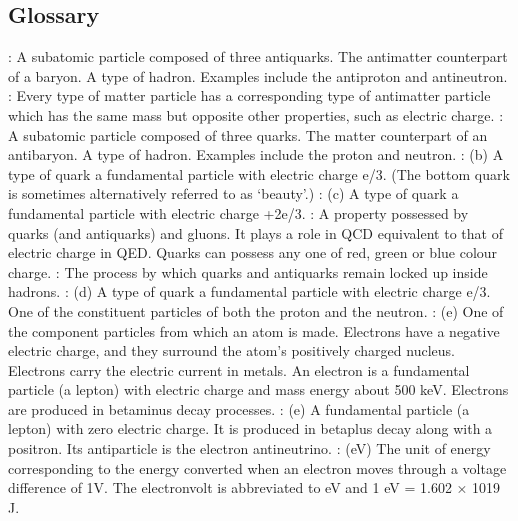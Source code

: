 \documentclass[letterpaper,10pt,english]{sphinxmanual}
\begin{document}
\subsection{Glossary}
\label{\detokenize{content/session_01/Part_01_glossary:Glossary}}\label{\detokenize{content/session_01/Part_01_glossary::doc}}
: A subatomic particle composed of three antiquarks. The antimatter counterpart of a baryon. A type of hadron. Examples include the antiproton and antineutron. : Every type of matter particle has a corresponding type of antimatter particle which has the same mass but opposite other properties, such as electric charge. : A subatomic particle composed of three quarks. The matter counterpart of an antibaryon. A type of hadron. Examples include the proton and
neutron. : (b) A type of quark \sphinxhyphen{} a fundamental particle with electric charge \textendash{}e/3. (The bottom quark is sometimes alternatively referred to as ‘beauty’.) : (c) A type of quark \sphinxhyphen{} a fundamental particle with electric charge +2e/3. : A property possessed by quarks (and antiquarks) and gluons. It plays a role in QCD equivalent to that of electric charge in QED. Quarks can possess any one of red, green or blue colour charge. : The process by which
quarks and antiquarks remain locked up inside hadrons. : (d) A type of quark \sphinxhyphen{} a fundamental particle with electric charge \textendash{}e/3. One of the constituent particles of both the proton and the neutron. : (e\sphinxhyphen{}) One of the component particles from which an atom is made. Electrons have a negative electric charge, and they surround the atom’s positively charged nucleus. Electrons carry the electric current in metals. An electron is a fundamental particle (a lepton) with electric
charge \textendash{} and mass energy about 500 keV. Electrons are produced in beta\sphinxhyphen{}minus decay processes. : (e) A fundamental particle (a lepton) with zero electric charge. It is produced in beta\sphinxhyphen{}plus decay along with a positron. Its antiparticle is the electron antineutrino. : (eV) The unit of energy corresponding to the energy converted when an electron moves through a voltage difference of 1V. The electronvolt is abbreviated to eV and 1 eV = 1.602 × 10\sphinxhyphen{}19 J.
\end{document}
